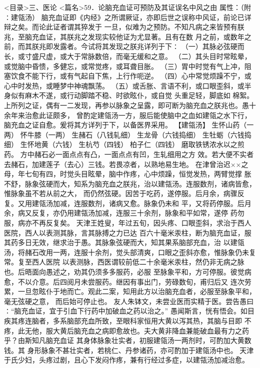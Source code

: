\documentclass[a4paper,12pt,UTF8,twoside]{ctexbook}
\begin{document}
<目录>三、医论
<篇名>59．论脑充血证可预防及其证误名中风之由
属性：（附∶建瓴汤） 
脑充血证即《内经》之所谓厥证，亦即后世之误称中风证，前论已详辩之矣。而论此证者谓其猝发于 
一旦，似难为之预防。不知凡病之来皆预有朕兆，至脑充血证，其朕兆之发现实较他证为尤显著。且有在数 
月之前，或数年之前，而其朕兆即发露者。今试将其发现之朕兆详列于下∶ 
（一）其脉必弦硬而长，或寸盛尺虚，或大于常脉数倍，而毫无缓和之意。 
（二）其头目时常眩晕，或觉脑中昏愦，多健忘，或常觉疼，或耳聋目胀。 
（三）胃中时觉有气上冲，阻塞饮食不能下行，或有气起自下焦，上行作呃逆。 
（四）心中常觉烦躁不宁，或心中时发热，或睡梦中神魂飘荡。 
（五）或舌胀、言语不利，或口眼歪斜，或半身似有麻木不遂，或行动脚踏不稳、时欲眩仆，或自觉 
头重足轻，脚底如 棉絮。 
上所列之证，偶有一二发现，再参以脉象之呈露，即可断为脑充血之朕兆也。愚十余年来治愈此证颇多， 
曾酌定建瓴汤一方，服后能使脑中之血如建瓴之水下行，脑充血之证自愈。爰将其方详列于下，以备医界采用。 
【建瓴汤】 
生怀山药（一两） 怀牛膝（一两） 生赭石（八钱轧细） 生龙骨（六钱捣细） 
生牡蛎（六钱捣细） 生怀地黄（六钱） 生杭芍（四钱） 柏子仁（四钱） 
磨取铁锈浓水以之煎药。 
方中赭石必一面点点有凸，一面点点有凹，生轧细用之方 
效。若大便不实者去赭石，加建莲子（去心）三钱。若畏凉者，以熟地易生地。 
在津曾治迟××之母，年七旬有四，时觉头目眩晕，脑中作疼，心中烦躁，恒觉发热，两臂觉撑 
胀不舒，脉象弦硬而大，知系为脑充血之朕兆，治以建瓴汤。连服数剂，诸病皆愈，惟脉象虽不若从前之大， 
而仍然弦硬。因苦于吃药，遂停服。后月余，病骤反复。又用建瓴汤加减，连服数剂，诸病又愈。脉象仍未和 
平，又将药停服。后月余，病又反复，亦仍用建瓴汤加减，连服三十余剂，脉象和平如常，遂停 
药勿服，病亦不再反复矣。 
天津王姓叟，年过五旬，因头疼、口眼歪斜，求治于西人医院，西人以表测其脉，言其脉搏之力已达 
百六十毫米汞柱，断为脑充血证，服其药多日无效，继求治于愚。其脉象弦硬而大，知其果系脑部充血，治 
以建瓴汤，将赭石改用一两，连服十余剂，觉头部清爽，口眼之歪斜亦愈，惟脉象仍未复常。复至西人医院 
以表测脉，西医谓较前低二十余毫米汞柱，然仍非无病之脉也。后晤面向愚述之，劝其仍须多多服药，必服 
至脉象平和，方可停服。彼觉病愈，不以介意。后四阅月未尝服药。继因有事出门，劳碌数旬，甫归后又 
连次劳累，一旦忽眩仆于地而亡。观此二案，知用此方以治脑充血者，必服至脉象平和，毫无弦硬之意， 
而后始可停止也。 
友人朱钵文，未尝业医而实精于医。尝告愚曰∶“脑充血证，宜于引血下行药中加破血之药以治之。” 
愚闻斯言，恍有悟会。如目疾其疼连脑者，多系脑部充血所致，至眼科家恒用大黄以泻其热，其脑与目即 
不疼，此无他，服大黄后脑充血之病即愈故也。夫大黄非降血兼能破血最有力之药乎？由斯知凡脑充血证 
其身体脉象壮实者，初服建瓴汤一两剂时，可酌加大黄数钱。其 
身形脉象不甚壮实者，若桃仁、丹参诸药，亦可酌加于建瓴汤中也。 
天津于氏少妇，头疼过剧，且心下发闷作疼，兼有行经过多症，以建瓴汤加减治愈。 
\end{document}
